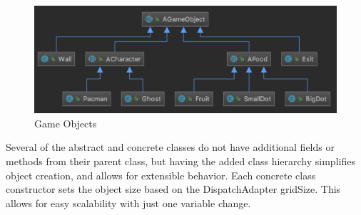 \documentclass[letterpaper, 11pt]{article}
\begin{document}
\begin{figure}[htbp] 
  \centering
  \includegraphics[width=.85\linewidth]{objects.png} 
  \caption{Game Objects}
  \label{fig1} 
\end{figure}

Several of the abstract and concrete classes do not have additional fields or methods from their parent class, but having the added class hierarchy simplifies object creation, and allows for extensible behavior. Each concrete class constructor sets the object size based on the DispatchAdapter gridSize. This allows for easy scalability with just one variable change. 
\end{document}
